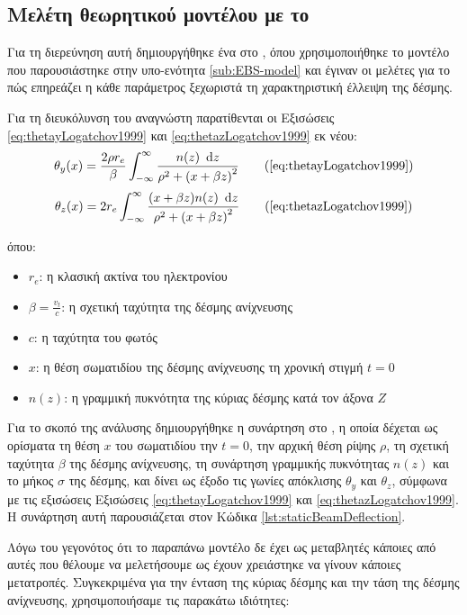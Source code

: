 \subsection{Μελέτη θεωρητικού μοντέλου με το } \label{sub:variable-analysis-MATLAB}
Για τη διερεύνηση αυτή δημιουργήθηκε ένα  στο , όπου χρησιμοποιήθηκε το μοντέλο που παρουσιάστηκε στην υπο-ενότητα \ref{sub:EBS-model} και έγιναν οι μελέτες για το πώς επηρεάζει η κάθε παράμετρος ξεχωριστά τη χαρακτηριστική έλλειψη της δέσμης. 

Για τη διευκόλυνση του αναγνώστη παρατίθενται οι Εξισώσεις \ref{eq:thetayLogatchov1999} και \ref{eq:thetazLogatchov1999} εκ νέου:
\begin{equation}
\theta_y (x) = \frac{2 \rho r_e}{\beta} \int_{-\infty}^{\infty}\frac{n(z) \dd z}{\rho^2 + \left(x+\beta z \right) ^2} \tag{\ref{eq:thetayLogatchov1999}} 
\end{equation}
\begin{equation}
\theta_z(x) = 2 r_e \int_{-\infty}^{\infty}\frac{(x+\beta z)n(z) \dd z}{\rho^2 + \left(x+\beta z \right) ^2}	\tag{\ref{eq:thetazLogatchov1999}} 
\end{equation}

όπου:
\begin{itemize}
\item $r_e$: η κλασική ακτίνα του ηλεκτρονίου
\item $\beta =\frac{v_t}{c}$: η σχετική ταχύτητα της δέσμης ανίχνευσης
\item $c$: η ταχύτητα του φωτός
\item $x$: η θέση σωματιδίου της δέσμης ανίχνευσης τη χρονική στιγμή $t=0$
\item $n(z)$: η γραμμική πυκνότητα της κύριας δέσμης κατά τον άξονα $Z$
\end{itemize} 

Για το σκοπό της ανάλυσης δημιουργήθηκε η συνάρτηση  στο , η οποία δέχεται ως ορίσματα τη θέση $x$ του σωματιδίου την $t = 0$, την αρχική θέση ρίψης $\rho$, τη σχετική ταχύτητα $\beta$ της δέσμης ανίχνευσης, τη συνάρτηση γραμμικής πυκνότητας $n(z)$ και το μήκος $\sigma$ της δέσμης, και δίνει ως έξοδο τις γωνίες απόκλισης $\theta_y$ και $\theta_z$, σύμφωνα με τις εξισώσεις Εξισώσεις \ref{eq:thetayLogatchov1999} και \ref{eq:thetazLogatchov1999}.
Η συνάρτηση αυτή παρουσιάζεται στον Κώδικα \ref{lst:staticBeamDeflection}.

Λόγω του γεγονότος ότι το παραπάνω μοντέλο δε έχει ως μεταβλητές κάποιες από αυτές που θέλουμε να μελετήσουμε ως έχουν χρειάστηκε να γίνουν κάποιες μετατροπές. 
Συγκεκριμένα για την ένταση της κύριας δέσμης και την τάση της δέσμης ανίχνευσης, χρησιμοποιήσαμε τις παρακάτω ιδιότητες:

